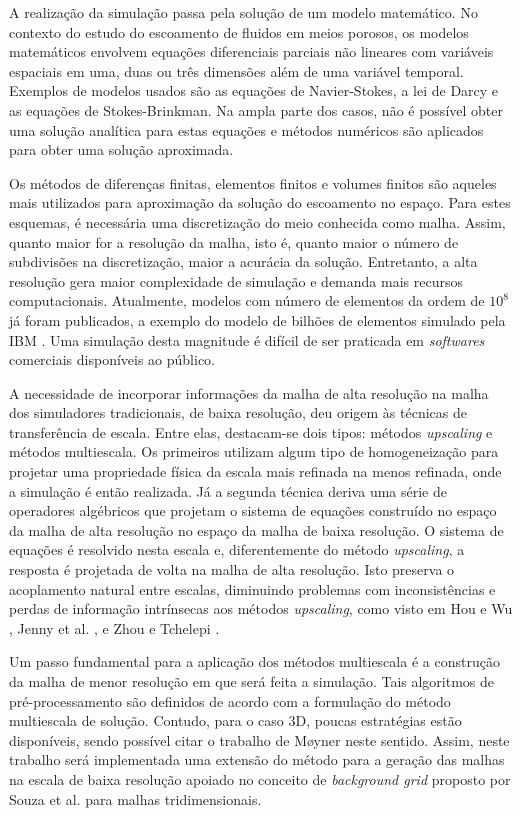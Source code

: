 \documentclass[a4paper, 10pt]{article}
\begin{document}
A realização da simulação passa pela solução de um modelo matemático. No contexto do estudo do escoamento de fluidos em meios porosos, os modelos matemáticos envolvem equações diferenciais parciais não lineares com variáveis espaciais em uma, duas ou três dimensões além de uma variável temporal. Exemplos de modelos usados são as equações de Navier-Stokes, a lei de Darcy e as equações de Stokes-Brinkman. Na ampla parte dos casos, não é possível obter uma solução analítica para estas equações e métodos numéricos são aplicados para obter uma solução aproximada.

Os métodos de diferenças finitas, elementos finitos e volumes finitos são aqueles mais utilizados para aproximação da solução do escoamento no espaço. Para estes esquemas, é necessária uma discretização do meio conhecida como malha. Assim, quanto maior for a resolução da malha, isto é, quanto maior o número de subdivisões na discretização, maior a acurácia da solução. Entretanto, a alta resolução gera maior complexidade de simulação e demanda mais recursos computacionais. Atualmente, modelos com número de elementos da ordem de $10^8$ já foram publicados, a exemplo do modelo de bilhões de elementos simulado pela IBM \cite{IBMBillion}. Uma simulação desta magnitude é difícil de ser praticada em \textit{softwares} comerciais disponíveis ao público.

A necessidade de incorporar informações da malha de alta resolução na malha dos simuladores tradicionais, de baixa resolução, deu origem às técnicas de transferência de escala. Entre elas, destacam-se dois tipos: métodos \textit{upscaling} e métodos multiescala. Os primeiros utilizam algum tipo de homogeneização para projetar uma propriedade física da escala mais refinada na menos refinada, onde a simulação é então realizada. Já a segunda técnica deriva uma série de operadores algébricos que projetam o sistema de equações construído no espaço da malha de alta resolução no espaço da malha de baixa resolução. O sistema de equações é resolvido nesta escala e, diferentemente do método \textit{upscaling}, a resposta é projetada de volta na malha de alta resolução. Isto preserva o acoplamento natural entre escalas, diminuindo problemas com inconsistências e perdas de informação intrínsecas aos métodos \textit{upscaling}, como visto em Hou e Wu \cite{HouAndWu}, Jenny et al. \cite{JennyAndLeeAndTchelepi}, e Zhou e Tchelepi \cite{ZhouAndTchelepi}.

Um passo fundamental para a aplicação dos métodos multiescala é a construção da malha de menor resolução em que será feita a simulação. Tais algoritmos de pré-processamento são definidos de acordo com a formulação do método multiescala de solução. Contudo, para o caso 3D, poucas estratégias estão disponíveis, sendo possível citar o trabalho de M\o yner \cite{Olav} neste sentido. Assim, neste trabalho será implementada uma extensão do método para a geração das malhas na escala de baixa resolução apoiado no conceito de \textit{background grid} proposto por Souza et al. \cite{Souza} para malhas tridimensionais.
\end{document}

